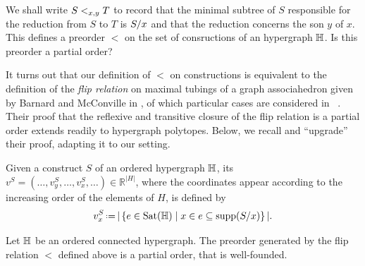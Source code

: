 We shall write $S <_{x,y} T$ to record that the  minimal  subtree of $S$ responsible for the reduction from $S$ to $T$ is $S/x$ and that the reduction concerns the son $y$ of $x$.
This defines a preorder $<$ on the set of consructions of an hypergraph ${\mathbb H}$.
Is this preorder a partial order? 

It turns out that our definition of $<$ on constructions is equivalent to the definition of the \emph{flip relation} on maximal tubings of a graph associahedron given by Barnard and McConville in \cite{Barnard-McConville}, of which particular cases are considered in ~\cite{Forcey-Tamari}.
Their proof that the reflexive and transitive closure of the flip relation is a partial order extends readily to hypergraph polytopes.
Below, we recall and ``upgrade'' their proof, adapting it to our setting.

\begin{definition}
  \label{def:coordinate-vector}
  Given a construct $S$ of an ordered hypergraph ${\mathbb H}$, its 
  $v^S=(\ldots,v^S_y,\ldots,v^S_x,\ldots) \in \mathbb{R}^{|H|}$, where the coordinates appear according to the increasing order of the elements of $H$, is defined by
  $$v^S_x\eqdef |\setc{e\in{\Sat}(\hyper{H})}{x\in e\inc \supp(\occ{S}{x})}|.$$
\end{definition}


\begin{proposition} 
\label{p:flip-partial-order}
Let ${\mathbb H}$ be an ordered connected hypergraph. 
The preorder generated by the flip relation $<$ defined above is a partial order, that is well-founded.
\end{proposition}

